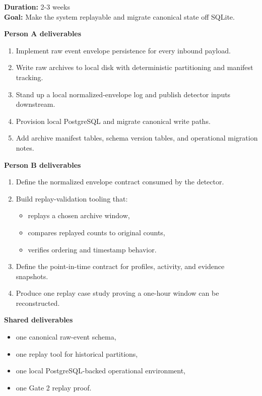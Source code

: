 \documentclass[
]{article}
\providecommand{\tightlist}{%
  \setlength{\itemsep}{0pt}\setlength{\parskip}{0pt}}
\begin{document}
\textbf{Duration:} 2-3 weeks\\
\textbf{Goal:} Make the system replayable and migrate canonical state
off SQLite.

\textbf{Person A deliverables}

\begin{enumerate}
\def\labelenumi{\arabic{enumi}.}
\tightlist
\item
  Implement raw event envelope persistence for every inbound payload.
\item
  Write raw archives to local disk with deterministic partitioning and
  manifest tracking.
\item
  Stand up a local normalized-envelope log and publish detector inputs
  downstream.
\item
  Provision local PostgreSQL and migrate canonical write paths.
\item
  Add archive manifest tables, schema version tables, and operational
  migration notes.
\end{enumerate}

\textbf{Person B deliverables}

\begin{enumerate}
\def\labelenumi{\arabic{enumi}.}
\tightlist
\item
  Define the normalized envelope contract consumed by the detector.
\item
  Build replay-validation tooling that:

  \begin{itemize}
  \tightlist
  \item
    replays a chosen archive window,
  \item
    compares replayed counts to original counts,
  \item
    verifies ordering and timestamp behavior.
  \end{itemize}
\item
  Define the point-in-time contract for profiles, activity, and evidence
  snapshots.
\item
  Produce one replay case study proving a one-hour window can be
  reconstructed.
\end{enumerate}

\textbf{Shared deliverables}

\begin{itemize}
\tightlist
\item
  one canonical raw-event schema,
\item
  one replay tool for historical partitions,
\item
  one local PostgreSQL-backed operational environment,
\item
  one Gate 2 replay proof.
\end{itemize}
\end{document}
